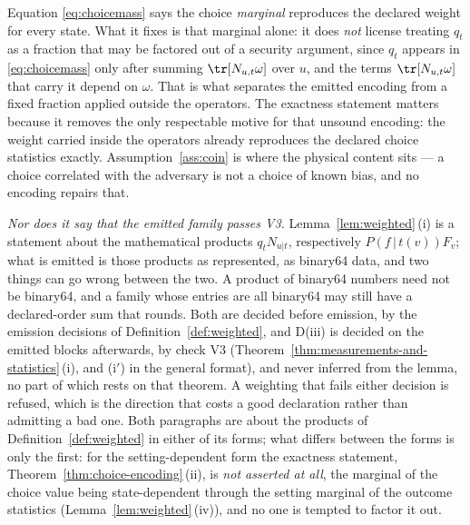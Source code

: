 
\begin{remark}\label{rem:exactness}
Equation \eqref{eq:choicemass} says the choice \emph{marginal} reproduces the
declared weight for every state. What it fixes is that marginal alone: it
does \emph{not} license treating $q_t$ as a fraction that may be factored out
of a security argument, since $q_t$ appears in \eqref{eq:choicemass} only after
summing $\tr[N_{u,t}\omega]$ over $u$, and the terms $\tr[N_{u,t}\omega]$
that carry it depend on $\omega$. That is what separates the emitted encoding
from a fixed fraction applied outside the operators. The exactness statement
matters because it removes the only respectable motive for that unsound
encoding: the weight carried inside the operators already reproduces the
declared choice statistics exactly. Assumption~\ref{ass:coin} is
where the physical content sits --- a choice correlated with the adversary is
not a choice of known bias, and no encoding repairs that.

\emph{Nor does it say that the emitted family passes V3.}
Lemma~\ref{lem:weighted}\,(i) is a statement about the mathematical products
$q_tN_{u|t}$, respectively $P(f\,|\,t(v))F_v$; what is emitted is those
products as represented, as binary64 data, and two things can go wrong between
the two. A product of binary64 numbers need not be binary64, and a family
whose entries are all binary64 may still have a declared-order sum that
rounds. Both are decided before emission, by the emission decisions of
Definition~\ref{def:weighted}, and D(iii) is decided on the emitted blocks
afterwards, by check V3 (Theorem~\ref{thm:measurements-and-statistics}\,(i),
and (i$'$) in the general format), and never inferred from
the lemma, no part of which rests on that theorem. A weighting that fails
either decision is refused, which is the direction that costs a good
declaration rather than admitting a bad one. Both paragraphs are about the products of
Definition~\ref{def:weighted} in either of its forms; what differs between
the forms is only the first: for the setting-dependent form the exactness
statement, Theorem~\ref{thm:choice-encoding}\,(ii), is \emph{not asserted at all}, the
marginal of the choice value being state-dependent through the setting
marginal of the outcome statistics (Lemma~\ref{lem:weighted}\,(iv)), and no
one is tempted to factor it out.
\end{remark}
